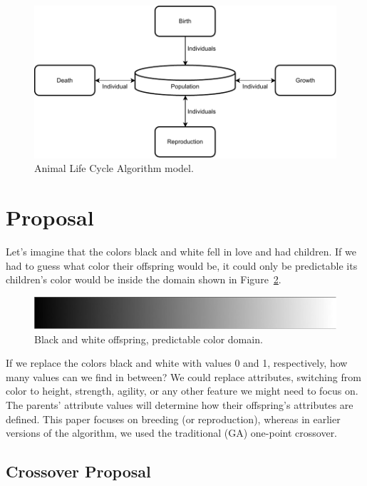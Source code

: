 \documentclass[graybox]{svmult}
\begin{document}
    \begin{figure}[!ht]
        \centering
        \includegraphics[width=0.90\linewidth]{img/fig_algorithm_model.pdf}
        \caption{Animal Life Cycle Algorithm model.} \label{fig.algorithm_model}
        \end{figure}


\section{Proposal}
    \label{section.proposal}

    Let's imagine that the colors black and white fell in love and had children. If we had to guess what color their offspring would be, it could only be predictable its children's color would be inside the domain shown in Figure~\ref{fig.grayscale_continuous}.

    \begin{figure}[!ht]
        \centering
        \includegraphics[width=0.70\linewidth]{img/fig_grayscale_continuous.pdf}
        \caption{Black and white offspring, predictable color domain.} \label{fig.grayscale_continuous}
        \end{figure}

    If we replace the colors black and white with values 0 and 1, respectively, how many values can we find in between? We could replace attributes, switching from color to height, strength, agility, or any other feature we might need to focus on. The parents' attribute values will determine how their offspring's attributes are defined. This paper focuses on breeding (or reproduction), whereas in earlier versions of the algorithm, we used the traditional (GA) one-point crossover. 

    \subsection{Crossover Proposal}
\end{document}
